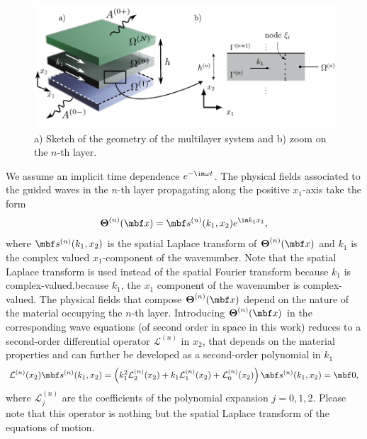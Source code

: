 \begin{figure}
    \centering
    \includegraphics{chapitres/article_JAP/fig1_schema.pdf}
    \caption{a) Sketch of the geometry of the multilayer system and b) zoom on the $n$-th layer.}
    \label{fig:schema_multilayer}
\end{figure}   
We assume an implicit time dependence $e^{-\im \omega t}$. The physical fields associated to the guided waves in the $n$-th layer propagating along the positive $x_1$-axis take the form
    \begin{equation}
         \boldsymbol{\Theta}^{(n)}  (\mbf x) = \mbf s^{(n)}(k_1,x_2) e^{\im k_1 x_1},
        \label{eq:field_ansatz}
    \end{equation}
where $\mbf s^{(n)}(k_1, x_2)$ is the spatial Laplace transform of $\boldsymbol{\Theta}^{(n)} (\mbf x)$ and $k_1$ is the complex valued $x_1$-component of the wavenumber. Note that the spatial Laplace transform is used instead of the spatial Fourier transform because $k_1$ is complex-valued.because $ k_1$, the $x_1$ component of the wavenumber is complex-valued. The physical fields that compose $\boldsymbol{\Theta}^{(n)}  (\mbf x)$ depend on the nature of the material occupying the $n$-th layer. Introducing $\boldsymbol{\Theta}^{(n)}  (\mbf x)$ in the corresponding wave equations (of second order in space in this work) reduces to a second-order differential operator $\mathcal L^{(n)}$ in $x_2$, that depends on the material properties and can further be developed as a second-order polynomial in $ k_1$
    \begin{equation}
        \mathcal L^{(n)}(x_2) \mbf s^{(n)}(k_1, x_2) = \left( k_1^2\mathcal L_2^{(n)}(x_2) + k_1\mathcal L_1^{(n)}(x_2) + \mathcal L_0^{(n)}(x_2) \right) \mbf s^{(n)}(k_1, x_2) = \mbf 0,
        \label{eq:operator_decomposition}
    \end{equation}
where $\mathcal L^{(n)}_j$ are the coefficients of the polynomial expansion $j=0,1,2$. Please note that this operator is nothing but the spatial Laplace transform of the equations of motion. 
    
